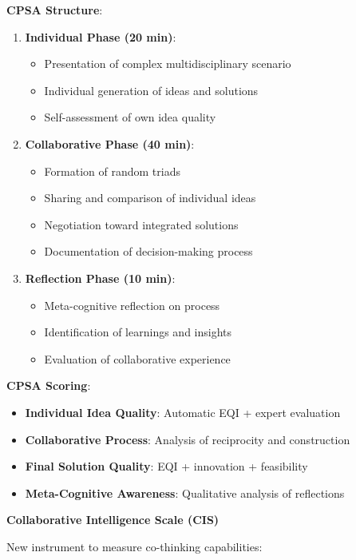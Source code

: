 \textbf{CPSA Structure}:
\begin{enumerate}
    \item \textbf{Individual Phase (20 min)}:
        \begin{itemize}
            \item Presentation of complex multidisciplinary scenario
            \item Individual generation of ideas and solutions
            \item Self-assessment of own idea quality
        \end{itemize}
    \item \textbf{Collaborative Phase (40 min)}:
        \begin{itemize}
            \item Formation of random triads
            \item Sharing and comparison of individual ideas
            \item Negotiation toward integrated solutions
            \item Documentation of decision-making process
        \end{itemize}
    \item \textbf{Reflection Phase (10 min)}:
        \begin{itemize}
            \item Meta-cognitive reflection on process
            \item Identification of learnings and insights
            \item Evaluation of collaborative experience
        \end{itemize}
\end{enumerate}

\textbf{CPSA Scoring}:
\begin{itemize}
    \item \textbf{Individual Idea Quality}: Automatic EQI + expert evaluation
    \item \textbf{Collaborative Process}: Analysis of reciprocity and construction
    \item \textbf{Final Solution Quality}: EQI + innovation + feasibility
    \item \textbf{Meta-Cognitive Awareness}: Qualitative analysis of reflections
\end{itemize}

\textbf{Collaborative Intelligence Scale (CIS)}

New instrument to measure co-thinking capabilities:

